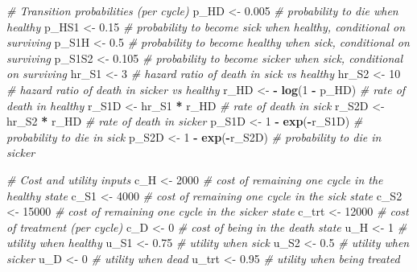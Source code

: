 \documentclass[]{article}
\newenvironment{Shaded}{\begin{snugshade}}{\end{snugshade}}
\newcommand{\KeywordTok}[1]{\textcolor[rgb]{0.13,0.29,0.53}{\textbf{#1}}}
\newcommand{\DecValTok}[1]{\textcolor[rgb]{0.00,0.00,0.81}{#1}}
\newcommand{\FloatTok}[1]{\textcolor[rgb]{0.00,0.00,0.81}{#1}}
\newcommand{\StringTok}[1]{\textcolor[rgb]{0.31,0.60,0.02}{#1}}
\newcommand{\CommentTok}[1]{\textcolor[rgb]{0.56,0.35,0.01}{\textit{#1}}}
\newcommand{\OperatorTok}[1]{\textcolor[rgb]{0.81,0.36,0.00}{\textbf{#1}}}
\newcommand{\NormalTok}[1]{#1}
\begin{document}
\begin{Shaded}
\begin{Highlighting}[]
\CommentTok{# Transition probabilities (per cycle)}
\NormalTok{p_HD    <-}\StringTok{ }\FloatTok{0.005}                    \CommentTok{# probability to die when healthy}
\NormalTok{p_HS1   <-}\StringTok{ }\FloatTok{0.15}                       \CommentTok{# probability to become sick when healthy, conditional on surviving}
\NormalTok{p_S1H   <-}\StringTok{ }\FloatTok{0.5}                        \CommentTok{# probability to become healthy when sick, conditional on surviving}
\NormalTok{p_S1S2  <-}\StringTok{ }\FloatTok{0.105}                      \CommentTok{# probability to become sicker when sick, conditional on surviving}
\NormalTok{hr_S1   <-}\StringTok{ }\DecValTok{3}                          \CommentTok{# hazard ratio of death in sick vs healthy}
\NormalTok{hr_S2   <-}\StringTok{ }\DecValTok{10}                         \CommentTok{# hazard ratio of death in sicker vs healthy }
\NormalTok{r_HD    <-}\StringTok{ }\OperatorTok{-}\StringTok{ }\KeywordTok{log}\NormalTok{(}\DecValTok{1} \OperatorTok{-}\StringTok{ }\NormalTok{p_HD)          }\CommentTok{# rate of death in healthy}
\NormalTok{r_S1D   <-}\StringTok{ }\NormalTok{hr_S1 }\OperatorTok{*}\StringTok{ }\NormalTok{r_HD               }\CommentTok{# rate of death in sick}
\NormalTok{r_S2D   <-}\StringTok{ }\NormalTok{hr_S2 }\OperatorTok{*}\StringTok{ }\NormalTok{r_HD               }\CommentTok{# rate of death in sicker}
\NormalTok{p_S1D   <-}\StringTok{ }\DecValTok{1} \OperatorTok{-}\StringTok{ }\KeywordTok{exp}\NormalTok{(}\OperatorTok{-}\NormalTok{r_S1D)          }\CommentTok{# probability to die in sick}
\NormalTok{p_S2D   <-}\StringTok{ }\DecValTok{1} \OperatorTok{-}\StringTok{ }\KeywordTok{exp}\NormalTok{(}\OperatorTok{-}\NormalTok{r_S2D)          }\CommentTok{# probability to die in sicker}

\CommentTok{# Cost and utility inputs }
\NormalTok{c_H     <-}\StringTok{ }\DecValTok{2000}                     \CommentTok{# cost of remaining one cycle in the healthy state}
\NormalTok{c_S1    <-}\StringTok{ }\DecValTok{4000}                     \CommentTok{# cost of remaining one cycle in the sick state}
\NormalTok{c_S2    <-}\StringTok{ }\DecValTok{15000}                    \CommentTok{# cost of remaining one cycle in the sicker state}
\NormalTok{c_trt   <-}\StringTok{ }\DecValTok{12000}                    \CommentTok{# cost of treatment (per cycle)}
\NormalTok{c_D     <-}\StringTok{ }\DecValTok{0}                        \CommentTok{# cost of being in the death state}
\NormalTok{u_H     <-}\StringTok{ }\DecValTok{1}                        \CommentTok{# utility when healthy}
\NormalTok{u_S1    <-}\StringTok{ }\FloatTok{0.75}                     \CommentTok{# utility when sick}
\NormalTok{u_S2    <-}\StringTok{ }\FloatTok{0.5}                      \CommentTok{# utility when sicker}
\NormalTok{u_D     <-}\StringTok{ }\DecValTok{0}                        \CommentTok{# utility when dead}
\NormalTok{u_trt   <-}\StringTok{ }\FloatTok{0.95}                     \CommentTok{# utility when being treated}


\end{Highlighting}
\end{Shaded}
\end{document}

